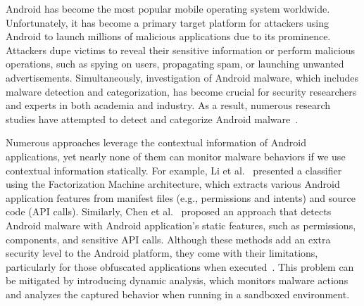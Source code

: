 \documentclass[runningheads]{llncs}
\begin{document}
Android has become the most popular mobile operating system worldwide. Unfortunately, it has become a primary target platform for attackers using Android to launch millions of malicious applications due to its prominence. Attackers dupe victims to reveal their sensitive information or perform malicious operations, such as spying on users, propagating spam, or launching unwanted advertisements. Simultaneously, investigation of Android malware, which includes malware detection and categorization, has become crucial for security researchers and experts in both academia and industry. As a result, numerous research studies have attempted to detect and categorize Android malware~\cite{canfora2015effectiveness,gascon2013structural,zulkifli2018android,mclaughlin2017deep,onwuzurike2019mamadroid,xu2021hawkeye,xu2020manis,xu2021falcon}.

Numerous approaches leverage the contextual information of Android applications, yet nearly none of them can monitor malware behaviors if we use contextual information statically. For example, Li et al.~\cite{li2019android} presented a classifier using the Factorization Machine architecture, which extracts various Android application features from manifest files (e.g., permissions and intents) and source code (API calls). Similarly, Chen et al.~\cite{chen2018android} proposed an approach that detects Android malware with Android application's static features, such as permissions, components, and sensitive API calls. Although these methods add an extra security level to the Android platform, they come with their limitations, particularly for those obfuscated applications when executed~\cite{comparetti2010identifying}. This problem can be mitigated by introducing dynamic analysis, which monitors malware actions and analyzes the captured behavior when running in a sandboxed environment.
\end{document}
